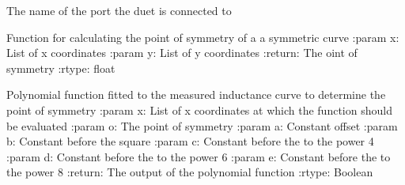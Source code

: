 \documentclass[letterpaper,10pt,english]{sphinxmanual}
\begin{document}
\begin{fulllineitems}
\begin{fulllineitems}
\end{fulllineitems}


\begin{fulllineitems}
\label{\detokenize{index:app.MainWindow.duet_port}}
\sphinxAtStartPar
The name of the port the duet is connected to

\end{fulllineitems}


\begin{fulllineitems}
\label{\detokenize{index:app.MainWindow.find_symmetry_axis}}
\sphinxAtStartPar
Function for calculating the point of symmetry of a a symmetric curve
:param x: List of x coordinates 
:param y: List of y coordinates
:return: The oint of symmetry
:rtype: float

\end{fulllineitems}


\begin{fulllineitems}
\label{\detokenize{index:app.MainWindow.func}}
\sphinxAtStartPar
Polynomial function fitted to the measured inductance curve to determine the point of symmetry
:param x: List of x coordinates at which the function should be evaluated
:param o: The point of symmetry
:param a: Constant offset
:param b: Constant before the square
:param c: Constant before the to the power 4
:param d: Constant before the to the power 6
:param e: Constant before the to the power 8
:return: The output of the polynomial function
:rtype: Boolean

\end{fulllineitems}



\end{fulllineitems}
\end{document}
